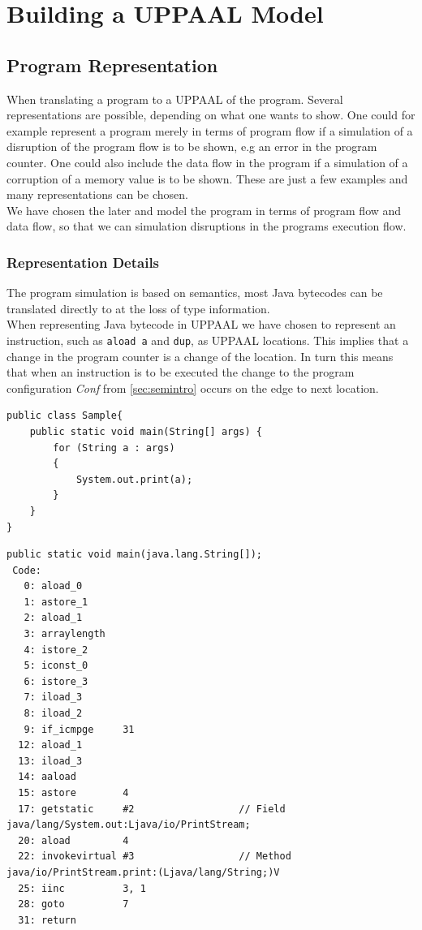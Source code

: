 \chapter{Building a UPPAAL Model}
\section{Program Representation}
When translating a program to a UPPAAL of the program. Several representations are possible, depending on what one wants to show. One could for example represent a program merely in terms of program flow if a simulation of a disruption of the program flow is to be shown, e.g an error in the program counter. One could also include the data flow in the program if a simulation of a corruption of a memory value is to be shown. These are just a few examples and many representations can be chosen.\\

We have chosen the later and model the program in terms of program flow and data flow, so that we can simulation disruptions in the programs execution flow. 


\subsection{Representation Details}
The program simulation is based on \jcl semantics, most Java bytecodes can be translated directly to \jcl at the loss of type information.\\

When representing Java bytecode in UPPAAL we have chosen to represent an instruction, such as \texttt{aload a} and \texttt{dup}, as UPPAAL locations. 
This implies that a change in the program counter is a change of the location. 
In turn this means that when an instruction is to be executed the change to the program configuration \textit{Conf} from  \cref{sec:semintro} occurs on the edge to next location.

\begin{lstlisting}[caption=Jave code sample.]
public class Sample{
    public static void main(String[] args) {
        for (String a : args)         
        {
            System.out.print(a);
        }
    }
}
\end{lstlisting}

\begin{lstlisting}[caption=Bytecode sample.]
public static void main(java.lang.String[]);
 Code:
   0: aload_0       
   1: astore_1      
   2: aload_1       
   3: arraylength   
   4: istore_2      
   5: iconst_0      
   6: istore_3      
   7: iload_3       
   8: iload_2       
   9: if_icmpge     31
  12: aload_1       
  13: iload_3       
  14: aaload        
  15: astore        4
  17: getstatic     #2                  // Field java/lang/System.out:Ljava/io/PrintStream;
  20: aload         4
  22: invokevirtual #3                  // Method java/io/PrintStream.print:(Ljava/lang/String;)V
  25: iinc          3, 1
  28: goto          7
  31: return        

\end{lstlisting}

